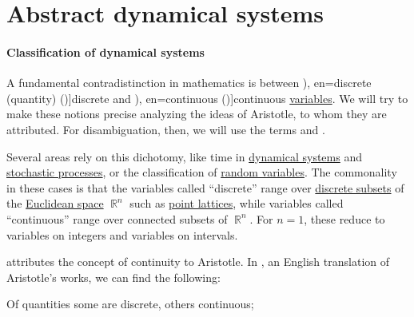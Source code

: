 \section{Abstract dynamical systems}\label{sec:abstract_dynamical_systems}

\paragraph{Classification of dynamical systems}

\begin{concept}\label{con:discrete_and_continuous_variables}
  A fundamental contradistinction in mathematics is between \term[ru=дискретная (величина) (\cite[16]{Розенфельд1963ОсновныеПонятиеГеометрии}), en=discrete (quantity) ({\cite[36]{Aristotle1984CompleteWorks:Categories})}]{discrete} and \term[ru=непрерывная (величина) (\cite[16]{Розенфельд1963ОсновныеПонятиеГеометрии}), en=continuous ({\cite[36]{Aristotle1984CompleteWorks:Categories}})]{continuous} \hyperref[con:variable]{variables}. We will try to make these notions precise analyzing the ideas of Aristotle, to whom they are attributed. For disambiguation, then, we will use the terms  and .

  Several areas rely on this dichotomy, like time in \hyperref[def:dynamical_system]{dynamical systems} and \hyperref[def:stochastic_process]{stochastic processes}, or the classification of \hyperref[def:random_variable]{random variables}. The commonality in these cases is that the variables called \enquote{discrete} range over \hyperref[def:discrete_set]{discrete subsets} of the \hyperref[def:euclidean_plane]{Euclidean space} \( \BbbR^n \) such as \hyperref[def:point_lattice]{point lattices}, while variables called \enquote{continuous} range over connected subsets of \( \BbbR^n \). For \( n = 1 \), these reduce to variables on integers and variables on intervals.

  \textcite[17]{Розенфельд1963ОсновныеПонятиеГеометрии} attributes the concept of continuity to Aristotle. In \cite[36]{Aristotle1984CompleteWorks:Categories}, an English translation of Aristotle's works, we can find the following:
  \begin{displayquote}
    Of quantities some are discrete, others continuous; \textellipsis


\end{displayquote}
\end{concept}
